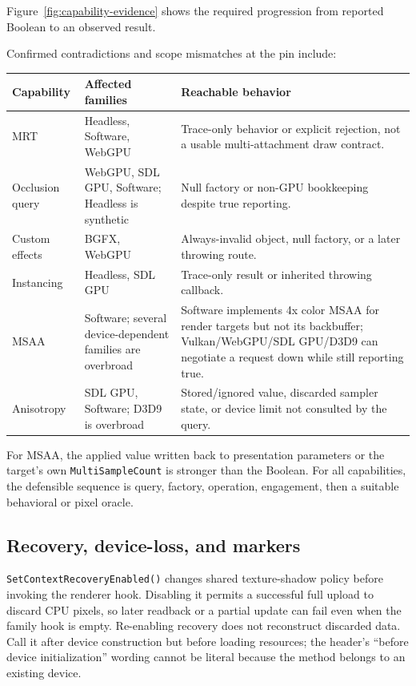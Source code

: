 Figure~\ref{fig:capability-evidence} shows the required progression from reported Boolean to
an observed result.

Confirmed contradictions and scope mismatches at the pin include:

\begin{center}
\small
\begin{tabular}{@{}p{}p{}p{}@{}}
\toprule
\textbf{Capability} & \textbf{Affected families} & \textbf{Reachable behavior} \\
\midrule
MRT & Headless, Software, WebGPU & Trace-only behavior or explicit rejection, not a usable multi-attachment draw contract. \\
Occlusion query & WebGPU, SDL GPU, Software; Headless is synthetic & Null factory or non-GPU bookkeeping despite true reporting. \\
Custom effects & BGFX, WebGPU & Always-invalid object, null factory, or a later throwing route. \\
Instancing & Headless, SDL GPU & Trace-only result or inherited throwing callback. \\
MSAA & Software; several device-dependent families are overbroad & Software implements 4x color MSAA for render targets but not its backbuffer; Vulkan/WebGPU/SDL GPU/D3D9 can negotiate a request down while still reporting true. \\
Anisotropy & SDL GPU, Software; D3D9 is overbroad & Stored/ignored value, discarded sampler state, or device limit not consulted by the query. \\
\bottomrule
\end{tabular}
\end{center}

For MSAA, the applied value written back to presentation parameters or the target's own
\texttt{MultiSampleCount} is stronger than the Boolean. For all capabilities, the defensible
sequence is query, factory, operation, engagement, then a suitable behavioral or pixel oracle.

\subsection{Recovery, device-loss, and markers}
\label{sec:backend-recovery-debug-matrix}

\texttt{SetContextRecoveryEnabled()} changes shared texture-shadow policy before invoking the
renderer hook. Disabling it permits a successful full upload to discard CPU pixels, so later
readback or a partial update can fail even when the family hook is empty. Re-enabling recovery
does not reconstruct discarded data. Call it after device construction but before loading
resources; the header's ``before device initialization'' wording cannot be literal because the
method belongs to an existing device.

